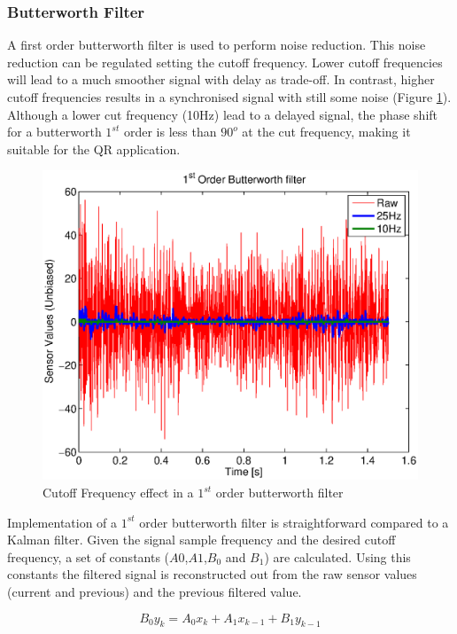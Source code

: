 \documentclass{article}
\begin{document}
\subsubsection{Butterworth Filter}

A first order butterworth filter is used to perform noise reduction. This noise reduction can be regulated setting the cutoff frequency. Lower cutoff frequencies will lead to a much smoother signal with delay as trade-off. In contrast, higher cutoff frequencies results in a synchronised signal with still some noise (Figure \ref{fig.NoiseComp}). Although a lower cut frequency (10Hz) lead to a delayed signal, the phase shift for a butterworth $1^{st}$ order is less than $90^{o}$ at the cut frequency, making it suitable for the QR application. 

\begin{figure}[ht]
\centering
	\includegraphics[scale=0.6]{Figures/NoiseComp.eps}
	\caption{Cutoff Frequency effect in a $1^{st}$ order butterworth filter}
	\label{fig.NoiseComp}
\end{figure}

Implementation of a $1^{st}$ order butterworth filter is straightforward compared to a Kalman filter. Given the signal sample frequency and the desired cutoff frequency, a set of constants ($A0$,$A1$,$B_0$ and $B_1$) are calculated. Using this constants the filtered signal is reconstructed out from the raw sensor values (current and previous) and the previous filtered value.

\begin{equation}
	 B_0 y_k = A_0 x_k + A_1 x_{k-1} + B_1 y_{k-1}
	 \label{eq:Butt1st}
\end{equation}
\end{document}
